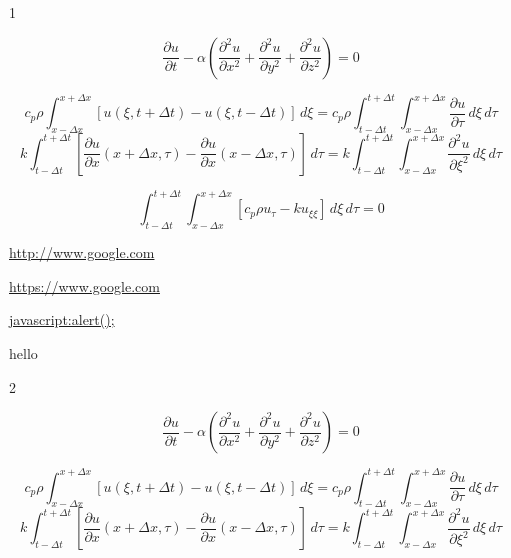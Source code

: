\documentclass{article}
\begin{document}
\begin{center}
\Huge{1}
\end{center}

\vskip 2cm
\begin{equation}
\frac{\partial u}{\partial t} -\alpha\left(\frac{\partial^2u}{\partial x^2}+\frac{\partial^2u}{\partial y^2}+\frac{\partial^2u}{\partial z^2}\right)=0
\end{equation}

\begin{equation}
c_p\rho \int_{x-\Delta x}^{x+\Delta x} [u(\xi,t+\Delta t)-u(\xi,t-\Delta t)]\, d\xi = c_p\rho\int_{t-\Delta t}^{t+\Delta t}\int_{x-\Delta x}^{x+\Delta x} \frac{\partial u}{\partial\tau}\,d\xi \, d\tau
\end{equation}
\begin{equation}
k\int_{t-\Delta t}^{t+\Delta t}\left[\frac{\partial u}{\partial x}(x+\Delta x,\tau)-\frac{\partial u}{\partial x}(x-\Delta x,\tau)\right]\,d\tau = k\int_{t-\Delta t}^{t+\Delta t}\int_{x-\Delta x}^{x+\Delta x}\frac{\partial^2u}{\partial\xi^2}\,d\xi\, d\tau
\end{equation}

\begin{equation}
\int_{t-\Delta t}^{t+\Delta t}\int_{x-\Delta x}^{x+\Delta x} [c_p\rho u_\tau - k u_{\xi\xi}]\, d\xi \, d\tau = 0
\end{equation}

\url{http://www.google.com}

\url{https://www.google.com}

\url{javascript:alert();}

\newpage

hello

\begin{center}
\Huge{2}
\end{center}

\vskip 2cm
\begin{equation}
\frac{\partial u}{\partial t} -\alpha\left(\frac{\partial^2u}{\partial x^2}+\frac{\partial^2u}{\partial y^2}+\frac{\partial^2u}{\partial z^2}\right)=0
\end{equation}

\begin{equation}
c_p\rho \int_{x-\Delta x}^{x+\Delta x} [u(\xi,t+\Delta t)-u(\xi,t-\Delta t)]\, d\xi = c_p\rho\int_{t-\Delta t}^{t+\Delta t}\int_{x-\Delta x}^{x+\Delta x} \frac{\partial u}{\partial\tau}\,d\xi \, d\tau
\end{equation}
\begin{equation}
k\int_{t-\Delta t}^{t+\Delta t}\left[\frac{\partial u}{\partial x}(x+\Delta x,\tau)-\frac{\partial u}{\partial x}(x-\Delta x,\tau)\right]\,d\tau = k\int_{t-\Delta t}^{t+\Delta t}\int_{x-\Delta x}^{x+\Delta x}\frac{\partial^2u}{\partial\xi^2}\,d\xi\, d\tau
\end{equation}
\end{document}
